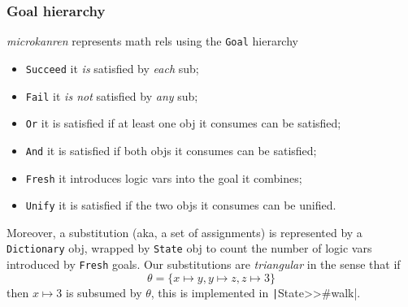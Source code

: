 \documentclass{beamer}
\begin{document}
\iffalse
\begin{frame}[fragile]
\frametitle{Chain combinators}
\begin{verbatim}
Bind class>>combine: aGoal with: aCollection
    ^ self new
        combiner: aGoal;
        stream: aCollection;
        yourself
\end{verbatim}
\begin{verbatim}
Bind>>interleavedStrategy: anInterleaved
    ^ stream bind: combiner interleaved: anInterleaved
\end{verbatim}
\begin{verbatim}
MPlus class>>with: aCollection with: anotherCollection
    ^ self new
        left: aCollection;
        right: anotherCollection;
        yourself
\end{verbatim}
\begin{verbatim}
MPlus>>interleavedStrategy: anInterleaved
    ^ left mplus: right interleaved: anInterleaved
\end{verbatim}
\begin{verbatim}
Sequential>>of: aStreamCombination
    ^ aStreamCombination sequentialStrategy: self
\end{verbatim}
\begin{verbatim}
Interleaved>>of: aStreamCombination
    ^ aStreamCombination interleavedStrategy: self
\end{verbatim}
\end{frame}
\fi

\begin{frame}[fragile]
\frametitle{Goal hierarchy}
\textit{microkanren} represents math rels using the \verb|Goal| hierarchy
\begin{itemize}
\item \verb|Succeed| it \textit{is} satisfied by \textit{each} sub;
\item \verb|Fail| it \textit{is not} satisfied by \textit{any} sub;
\item \verb|Or| it is satisfied if at least one obj it consumes can be satisfied;
\item \verb|And| it is satisfied if both objs it consumes can be satisfied;
\item \verb|Fresh| it introduces logic vars into the goal it combines;
\item \verb|Unify| it is satisfied if the two objs it consumes can be unified.
\end{itemize}
\vfill
Moreover, a substitution (aka, a set of assignments) is represented by a
\verb|Dictionary| obj, wrapped by \verb|State| obj to count the number of logic
vars introduced by \verb|Fresh| goals.
\vfill
Our substitutions are \textit{triangular} in the sense that if
\begin{displaymath}
\theta =  \lbrace x \mapsto y, y \mapsto z, z \mapsto 3 \rbrace
\end{displaymath}
then $x \mapsto 3$ is subsumed by $\theta$,
this is implemented in \texttt|State>>#walk|.
\end{frame}
\end{document}
